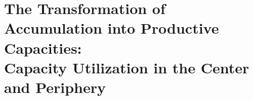 %
%
%

\graphicspath{%
  {Chapter2/}%
  {Chapter2/figures/}%
}

\chapter[Essay 2 \textemdash{} The Transformation of Accumulation into Productive Capacities: Capacity Utilization in the Center and Periphery]%
  {The Transformation of Accumulation into Productive Capacities:\\
   Capacity Utilization in the Center and Periphery}

\vspace{0.8em}


